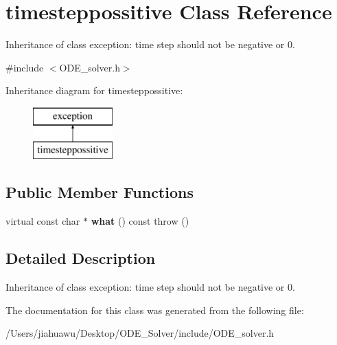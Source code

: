 \hypertarget{classtimesteppossitive}{}\section{timesteppossitive Class Reference}
\label{classtimesteppossitive}


Inheritance of class exception\+: time step should not be negative or 0.  




{\ttfamily \#include $<$O\+D\+E\+\_\+solver.\+h$>$}

Inheritance diagram for timesteppossitive\+:\begin{figure}[H]
\begin{center}
\leavevmode
\includegraphics[height=2.000000cm]{classtimesteppossitive}
\end{center}
\end{figure}
\subsection*{Public Member Functions}
\begin{DoxyCompactItemize}
\item 
\mbox{\label{classtimesteppossitive_acd3f5fd077ab556acf7f5abf73c87e3c}} 
virtual const char $\ast$ {\bfseries what} () const  throw ()
\end{DoxyCompactItemize}


\subsection{Detailed Description}
Inheritance of class exception\+: time step should not be negative or 0. 

The documentation for this class was generated from the following file\+:\begin{DoxyCompactItemize}
\item 
/\+Users/jiahuawu/\+Desktop/\+O\+D\+E\+\_\+\+Solver/include/O\+D\+E\+\_\+solver.\+h\end{DoxyCompactItemize}
